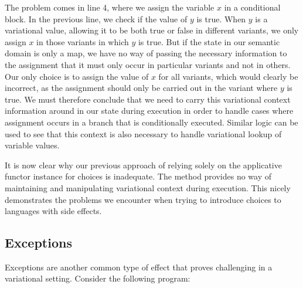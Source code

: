 \documentclass[letterpaper,10pt,onecolumn]{article}
\begin{document}
The problem comes in line 4, where we assign the variable $x$ in a conditional block. In the previous line, we check if the value of
$y$ is true. When $y$ is a variational value, allowing it to be both true or false in different variants, we only assign $x$ in those variants
in which $y$ is true. But if the state in our semantic domain is only a map, we have no way of passing the necessary information to the
assignment that it must only occur in particular variants and not in others. Our only choice is to assign the value of $x$ for all variants,
which would clearly be incorrect, as the assignment should only be carried out in the variant where $y$ is true. We must therefore
conclude that we need to carry this variational context information around in our state during execution in order to handle cases where
assignment occurs in a branch that is conditionally executed. Similar logic can be used to see that this context is also necessary to handle
variational lookup of variable values.

It is now clear why our previous approach of relying solely on the applicative functor instance for choices is inadequate. The method provides
no way of maintaining and manipulating variational context during execution. This nicely demonstrates the problems we encounter when
trying to introduce choices to languages with side effects.

%
%
%
% 

\subsection{Exceptions}

Exceptions are another common type of effect that proves challenging in a variational setting.
Consider the following program:
\end{document}
